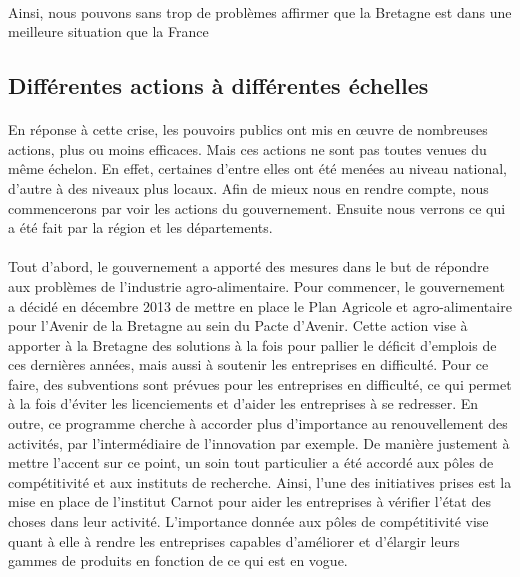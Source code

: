 \documentclass[a4paper,12pt]{report}
\begin{document}
			\paragraph{}Ainsi, nous pouvons sans trop de problèmes affirmer que la Bretagne est dans une meilleure situation que la France
			
		\subsection{Différentes actions à différentes échelles}
			\paragraph{}En réponse à cette crise, les pouvoirs publics ont mis en œuvre de nombreuses actions, plus ou moins efficaces. Mais ces actions ne sont pas toutes venues du même échelon. En effet, certaines d'entre elles ont été menées au niveau national, d'autre à des niveaux plus locaux. Afin de mieux nous en rendre compte, nous commencerons par voir les actions du gouvernement. Ensuite nous verrons ce qui a été fait par la région et les départements.

			\paragraph{}Tout d’abord, le gouvernement a apporté des mesures dans le but de répondre aux problèmes de l’industrie agro-alimentaire. Pour commencer, le gouvernement a décidé en décembre 2013 de mettre en place le Plan Agricole et agro-alimentaire pour l’Avenir de la Bretagne au sein du Pacte d’Avenir\cite{PacteAvenirBretagne}. Cette action vise à apporter à la Bretagne des solutions à la fois pour pallier le déficit d’emplois de ces dernières années, mais aussi à soutenir les entreprises en difficulté. Pour ce faire, des subventions sont prévues pour les entreprises en difficulté, ce qui permet à la fois d’éviter les licenciements et d’aider les entreprises à se redresser. En outre, ce programme cherche à accorder plus d’importance au renouvellement des activités, par l’intermédiaire de l’innovation par exemple. De manière justement à mettre l’accent sur ce point, un soin tout particulier a été accordé aux pôles de compétitivité et aux instituts de recherche. Ainsi, l'une des initiatives prises est la mise en place de l’institut Carnot pour aider les entreprises à vérifier l’état des choses dans leur activité. L’importance donnée aux pôles de compétitivité vise quant à elle à rendre les entreprises capables d’améliorer et d’élargir leurs gammes de produits en fonction de ce qui est en vogue.
\end{document}
